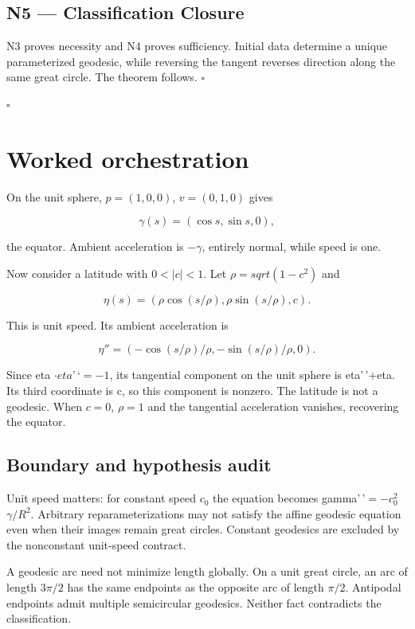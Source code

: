 \documentclass[preprint,12pt,aps,pra,showkeys,amsmath,amssymb,superscriptaddress,floatfix]{revtex4-2}
\theoremstyle{definition}
\theoremstyle{remark}
\begin{document}
\subsection{N5 --- Classification
Closure}\label{n5-classification-closure}

N3 proves necessity and N4 proves sufficiency. Initial data determine a
unique parameterized geodesic, while reversing the tangent reverses
direction along the same great circle. The theorem follows. \(\square\)

\hfill$\square$

\section{Worked orchestration}

On the unit sphere, \(p=(1,0,0)\), \(v=(0,1,0)\) gives

\[\gamma(s)=(\cos s,\sin s,0),\]

the equator. Ambient acceleration is \(-\gamma\), entirely normal, while
speed is one.

Now consider a latitude with \(0<|c|<1\). Let \(\rho =sqrt(1-c^{2})\)
and

\[\eta(s)=(\rho\cos(s/\rho),\rho\sin(s/\rho),c).\]

This is unit speed. Its ambient acceleration is

\[\eta''=(-\cos(s/\rho)/\rho,-\sin(s/\rho)/\rho,0).\]

Since eta \(\cdot eta\)'\,`\(=-1\), its tangential component on the unit
sphere is eta'\,'+eta. Its third coordinate is c, so this component is
nonzero. The latitude is not a geodesic. When \(c=0\), \(\rho =1\) and
the tangential acceleration vanishes, recovering the equator.

\subsection{Boundary and hypothesis audit}

Unit speed matters: for constant speed \(c_{0}\) the equation becomes
gamma'\,'\(=-c_{0}^{2}\) \(\gamma /R^{2}\). Arbitrary
reparameterizations may not satisfy the affine geodesic equation even
when their images remain great circles. Constant geodesics are excluded
by the nonconstant unit-speed contract.

A geodesic arc need not minimize length globally. On a unit great
circle, an arc of length \(3\pi /2\) has the same endpoints as the
opposite arc of length \(\pi /2\). Antipodal endpoints admit multiple
semicircular geodesics. Neither fact contradicts the classification.
\end{document}
